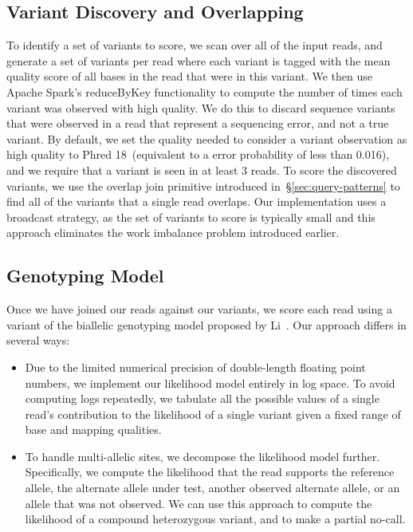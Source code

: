 \documentclass[phd]{ucbthesis}
\begin{document}
\subsection{Variant Discovery and Overlapping}
\label{sec:discovery}

To identify a set of variants to score, we scan over all of the input reads,
and generate a set of variants per read where each variant is tagged with the
mean quality score of all bases in the read that were in this variant. We then
use {Apache Spark}'s {reduceByKey} functionality to compute
the number of times each variant was observed with high quality. We do this
to discard sequence variants that were observed in a read that represent a
sequencing error, and not a true variant. By default, we set the quality
needed to consider a variant observation as high quality to Phred 18~(equivalent
to a error probability of less than 0.016), and we require that a variant is
seen in at least 3 reads. To score the discovered variants, we use the overlap
join primitive introduced in~\S\ref{sec:query-patterns} to find all of the
variants that a single read overlaps. Our implementation uses a broadcast
strategy, as the set of variants to score is typically small and this approach
eliminates the work imbalance problem introduced earlier.

\subsection{Genotyping Model}
\label{sec:genotyping-model}

Once we have joined our reads against our variants, we score each read using
a variant of the biallelic genotyping model proposed by Li~\cite{li11}. Our
approach differs in several ways:

\begin{itemize}
\item Due to the limited numerical precision of double-length floating point
  numbers, we implement our likelihood model entirely in log space. To avoid
  computing logs repeatedly, we tabulate all the possible values of a single
  read's contribution to the likelihood of a single variant given a fixed range
  of base and mapping qualities.
\item To handle multi-allelic sites, we decompose the likelihood model further.
  Specifically, we compute the likelihood that the read supports the reference
  allele, the alternate allele under test, another observed alternate allele,
  or an allele that was not observed. We can use this approach to compute the
  likelihood of a compound heterozygous variant, and to make a partial no-call.
\end{itemize}
\end{document}
